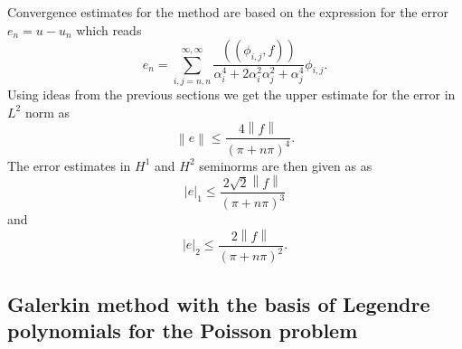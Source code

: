 \documentclass[a4paper,10pt]{article}
\newcommand{\norm}[1]{\ensuremath{\left\|#1\right\|}}
\newcommand{\seminorm}[1]{\ensuremath{\left|#1\right|}}
\newcommand{\Inner}[2]{\ensuremath{\left(\left(#1, #2\right)\right)}}
\begin{document}
  Convergence estimates for the method are based on the expression for the error
  $e_n=u-u_n$ which reads
  \[
    e_n = \sum\limits_{i, j = n, n}^{\infty, \infty} \frac{\Inner{\phi_{i,
    j}}{f}}{\alpha_i^4 + 2\alpha_i^2\alpha_j^2 + \alpha_j^4}\phi_{i, j}.
  \]
  Using ideas from the previous sections we get the upper estimate for the error
  in $L^2$ norm
  as
  \[
    \norm{e} \leq \frac{4\norm{f}}{\left(\pi + n\pi \right)^4}.
  \]
  The error estimates in $H^1$ and $H^2$ seminorms are then given as 
  as
  \[
    \seminorm{e}_1 \leq \frac{2\sqrt{2}\norm{f}}{\left(\pi + n\pi \right)^3}
  \]
  and
  \[
    \seminorm{e}_2 \leq \frac{2\norm{f}}{\left(\pi + n\pi \right)^2}.
  \]
  \subsection{Galerkin method with the basis of Legendre polynomials for the
  Poisson problem}

 
\end{document}
